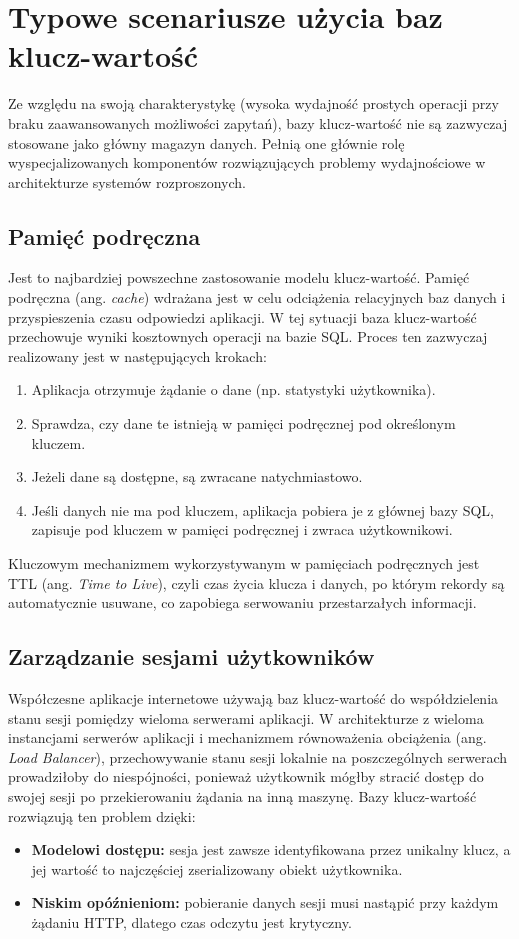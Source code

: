 \section{Typowe scenariusze użycia baz klucz-wartość}
Ze względu na swoją charakterystykę (wysoka wydajność prostych operacji przy braku zaawansowanych możliwości zapytań), bazy klucz-wartość nie są zazwyczaj stosowane jako główny magazyn danych. Pełnią one głównie rolę wyspecjalizowanych komponentów rozwiązujących problemy wydajnościowe w architekturze systemów rozproszonych.
\subsection{Pamięć podręczna}
Jest to najbardziej powszechne zastosowanie modelu klucz-wartość. Pamięć podręczna (ang. \emph{cache}) wdrażana jest w celu odciążenia relacyjnych baz danych i przyspieszenia czasu odpowiedzi aplikacji. W tej sytuacji baza klucz-wartość przechowuje wyniki kosztownych operacji na bazie SQL. Proces ten zazwyczaj realizowany jest w następujących krokach:
\begin{enumerate}
    \item Aplikacja otrzymuje żądanie o dane (np. statystyki użytkownika).
    \item Sprawdza, czy dane te istnieją w pamięci podręcznej pod określonym kluczem.
    \item Jeżeli dane są dostępne, są zwracane natychmiastowo.
    \item Jeśli danych nie ma pod kluczem, aplikacja pobiera je z głównej bazy SQL, zapisuje pod kluczem w pamięci podręcznej i zwraca użytkownikowi.
\end{enumerate}
Kluczowym mechanizmem wykorzystywanym w pamięciach podręcznych jest TTL (ang. \emph{Time to Live}), czyli czas życia klucza i danych, po którym rekordy są automatycznie usuwane, co zapobiega serwowaniu przestarzałych informacji.
\subsection{Zarządzanie sesjami użytkowników}
Współczesne aplikacje internetowe używają baz klucz-wartość do współdzielenia stanu sesji pomiędzy wieloma serwerami aplikacji. W architekturze z wieloma instancjami serwerów aplikacji i mechanizmem równoważenia obciążenia (ang. \emph{Load Balancer}), przechowywanie stanu sesji lokalnie na poszczególnych serwerach prowadziłoby do niespójności, ponieważ użytkownik mógłby stracić dostęp do swojej sesji po przekierowaniu żądania na inną maszynę. Bazy klucz-wartość rozwiązują ten problem dzięki:
\begin{itemize}
    \item \textbf{Modelowi dostępu:} sesja jest zawsze identyfikowana przez unikalny klucz, a jej wartość to najczęściej zserializowany obiekt użytkownika.
    \item \textbf{Niskim opóźnieniom:} pobieranie danych sesji musi nastąpić przy każdym żądaniu HTTP, dlatego czas odczytu jest krytyczny.
\end{itemize}
